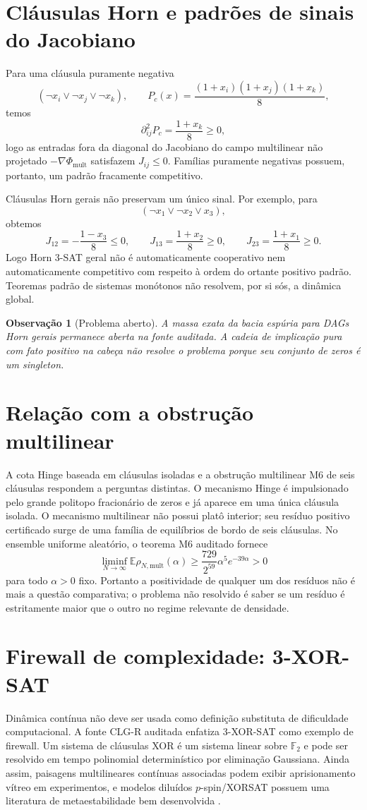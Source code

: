 \documentclass[11pt,a4paper]{article}
\newtheorem{remark}[theorem]{Observação}
\begin{document}
\section{Cláusulas Horn e padrões de sinais do Jacobiano}
Para uma cláusula puramente negativa
\[
(\neg x_i\lor\neg x_j\lor\neg x_k),
\qquad
P_c(x)=\frac{(1+x_i)(1+x_j)(1+x_k)}8,
\]
temos
\[
\partial_{ij}^2P_c=\frac{1+x_k}{8}\ge0,
\]
logo as entradas fora da diagonal do Jacobiano do campo multilinear não projetado $-\nabla\Phi_{\mathrm{mult}}$ satisfazem $J_{ij}\le0$. Famílias puramente negativas possuem, portanto, um padrão fracamente competitivo.

Cláusulas Horn gerais não preservam um único sinal. Por exemplo, para
\[
(\neg x_1\lor\neg x_2\lor x_3),
\]
obtemos
\[
J_{12}=-\frac{1-x_3}{8}\le0,
\qquad
J_{13}=\frac{1+x_2}{8}\ge0,
\qquad
J_{23}=\frac{1+x_1}{8}\ge0.
\]
Logo Horn 3-SAT geral não é automaticamente cooperativo nem automaticamente competitivo com respeito à ordem do ortante positivo padrão. Teoremas padrão de sistemas monótonos não resolvem, por si sós, a dinâmica global.

\begin{remark}[Problema aberto]
A massa exata da bacia espúria para DAGs Horn gerais permanece aberta na fonte auditada. A cadeia de implicação pura com fato positivo na cabeça não resolve o problema porque seu conjunto de zeros é um singleton.
\end{remark}

\section{Relação com a obstrução multilinear}
A cota Hinge baseada em cláusulas isoladas e a obstrução multilinear M6 de seis cláusulas respondem a perguntas distintas. O mecanismo Hinge é impulsionado pelo grande politopo fracionário de zeros e já aparece em uma única cláusula isolada. O mecanismo multilinear não possui platô interior; seu resíduo positivo certificado surge de uma família de equilíbrios de bordo de seis cláusulas. No ensemble uniforme aleatório, o teorema M6 auditado fornece
\[
\liminf_{N\to\infty}\mathbb E\rho_{N,\mathrm{mult}}(\alpha)
\ge\frac{729}{2^{59}}\alpha^5e^{-39\alpha}>0
\]
para todo $\alpha>0$ fixo. Portanto a positividade de qualquer um dos resíduos não é mais a questão comparativa; o problema não resolvido é saber se um resíduo é estritamente maior que o outro no regime relevante de densidade.

\section{Firewall de complexidade: 3-XOR-SAT}
Dinâmica contínua não deve ser usada como definição substituta de dificuldade computacional. A fonte CLG-R auditada enfatiza 3-XOR-SAT como exemplo de firewall. Um sistema de cláusulas XOR é um sistema linear sobre $\mathbb F_2$ e pode ser resolvido em tempo polinomial determinístico por eliminação Gaussiana. Ainda assim, paisagens multilineares contínuas associadas podem exibir aprisionamento vítreo em experimentos, e modelos diluídos $p$-spin/XORSAT possuem uma literatura de metaestabilidade bem desenvolvida \cite{mezard2003two,ricci2010being}.
\end{document}
